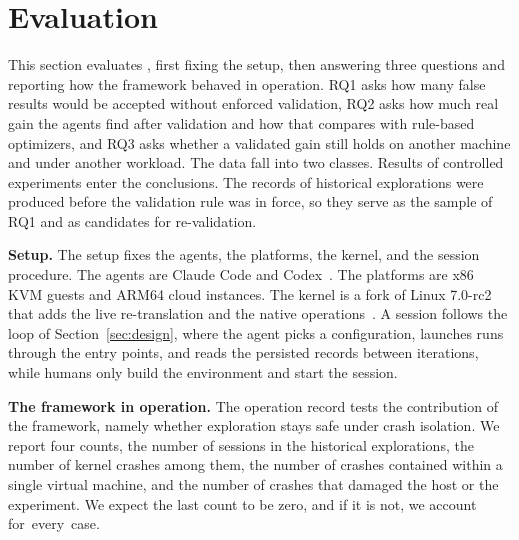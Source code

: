 \section{Evaluation}\label{sec:eval}

This section evaluates \sys, first fixing the setup, then answering three questions and reporting how the framework behaved in operation.
RQ1 asks how many false results would be accepted without enforced validation, RQ2 asks how much real gain the agents find after validation and how that compares with rule-based optimizers, and RQ3 asks whether a validated gain still holds on another machine and under another workload.
The data fall into two classes.
Results of controlled experiments enter the conclusions.
The records of historical explorations were produced before the validation rule was in force, so they serve as the sample of RQ1 and as candidates for re-validation.

\noindent\textbf{Setup.}
The setup fixes the agents, the platforms, the kernel, and the session procedure.
The agents are Claude Code and Codex~\cite{claudecode2025,openaicodex2025}.
The platforms are x86 KVM guests and ARM64 cloud instances.
The kernel is a fork of Linux 7.0-rc2 that adds the live re-translation and the native operations~\cite{zheng2026kops}.
A session follows the loop of Section~\ref{sec:design}, where the agent picks a configuration, launches runs through the entry points, and reads the persisted records between iterations, while humans only build the environment and start the session.

\noindent\textbf{The framework in operation.}
The operation record tests the contribution of the framework, namely whether exploration stays safe under crash isolation.
We report four counts, the number of sessions in the historical explorations, the number of kernel crashes among them, the number of crashes contained within a single virtual machine, and the number of crashes that damaged the host or the experiment.
We expect the last count to be zero, and if it is not, we account for~every~case.


